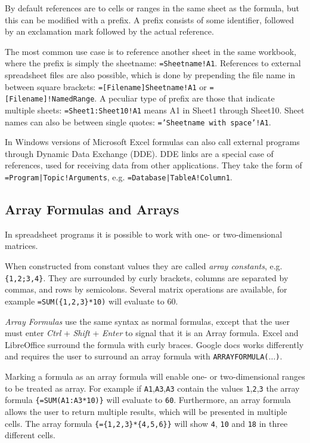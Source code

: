 \documentclass[12pt,a4paper,onecolumn,oneside]{memoir}
\begin{document}
By default references are to cells or ranges in the same sheet as the formula, but this can be modified with a prefix. A prefix consists of some identifier, followed by an exclamation mark followed by the actual reference.

The most common use case is to reference another sheet in the same workbook, where the prefix is simply the sheetname: \texttt{=Sheetname!A1}. References to external spreadsheet files are also possible, which is done by prepending the file name in between square brackets: \texttt{=[Filename]Sheetname!A1} or \texttt{=[Filename]!NamedRange}.
A peculiar type of prefix are those that indicate multiple sheets: \texttt{=Sheet1:Sheet10!A1} means A1 in Sheet1 through Sheet10.
Sheet names can also be between single quotes: \texttt{='Sheetname with space'!A1}. 

In Windows versions of Microsoft Excel formulas can also call external programs through Dynamic Data Exchange (DDE). DDE links are a special case of references, used for receiving data from other applications. They take the form of \texttt{=Program|Topic!Arguments}, e.g. \texttt{=Database|TableA!Column1}.

\subsection{Array Formulas and Arrays}
\label{sec:arrayformulas}
In spreadsheet programs it is possible to work with one- or two-dimensional matrices.

When constructed from constant values they are called \emph{array constants}, e.g. \texttt{\{1,2;3,4\}}.
They are surrounded by curly brackets, columns are separated by commas, and rows by semicolons.
Several matrix operations are available, for example \texttt{=SUM(\{1,2,3\}*10)} will evaluate to 60.

\emph{Array Formulas} use the same syntax as normal formulas, except that the user must enter \emph{Ctrl} + \emph{Shift} + \emph{Enter} to signal that it is an Array formula.
Excel and LibreOffice surround the formula with curly braces.
Google docs works differently and requires the user to surround an array formula with \texttt{ARRAYFORMULA($\ldots$)}.

Marking a formula as an array formula will enable one- or two-dimensional ranges to be treated as array.
For example if \texttt{A1},\texttt{A3},\texttt{A3} contain the values \texttt{1},\texttt{2},\texttt{3} the array formula \texttt{\{=SUM(A1:A3*10)\}} will evaluate to \texttt{60}. Furthermore, an array formula allows the user to return multiple results, which will be presented in multiple cells.
The array formula \texttt{\{=\{1,2,3\}*\{4,5,6\}\}} will show \texttt{4}, \texttt{10} and \texttt{18} in three different cells.
\end{document}
